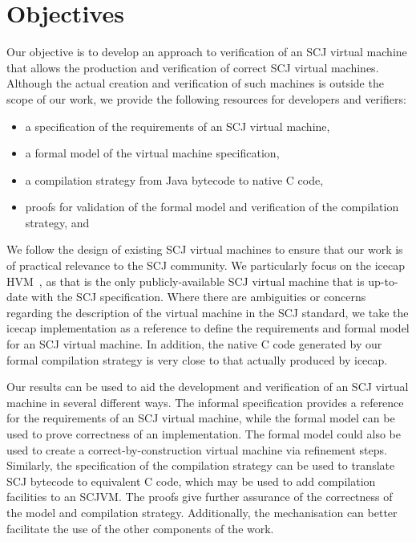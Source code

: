 \section{Objectives}

Our objective is to develop an approach to verification of an SCJ
virtual machine that allows the production and verification of correct
SCJ virtual machines.
Although the actual creation and verification of such machines is
outside the scope of our work, we provide the following resources for
developers and verifiers:
\begin{itemize}
\item a specification of the requirements of an SCJ virtual machine,
\item a formal model of the virtual machine specification,
\item a compilation strategy from Java bytecode to native C code,
\item proofs for validation of the formal model and verification of
  the compilation strategy, and
\end{itemize}

We follow the design of existing SCJ virtual machines to ensure that
our work is of practical relevance to the SCJ community.
We particularly focus on the icecap HVM~\cite{sondergaard2012}, as
that is the only publicly-available SCJ virtual machine that is
up-to-date with the SCJ specification.
Where there are ambiguities or concerns regarding the description of
the virtual machine in the SCJ standard, we take the icecap
implementation as a reference to define the requirements and formal
model for an SCJ virtual machine.
In addition, the native C code generated by our formal compilation
strategy is very close
to that actually produced by icecap.

Our results can be used to aid the development and verification of an
SCJ virtual machine in several different ways.
The informal specification provides a reference for the requirements
of an SCJ virtual machine, while the formal model can be used to prove
correctness of an implementation.
The formal model could also be used to create a
correct-by-construction virtual machine via refinement steps.
Similarly, the specification of the compilation strategy can be used
to translate SCJ bytecode to equivalent C code, which may be used to
add compilation facilities to an SCJVM.
The proofs give further assurance of the correctness of the model and
compilation strategy.
Additionally, the mechanisation can better facilitate the use of the
other components of the work.



